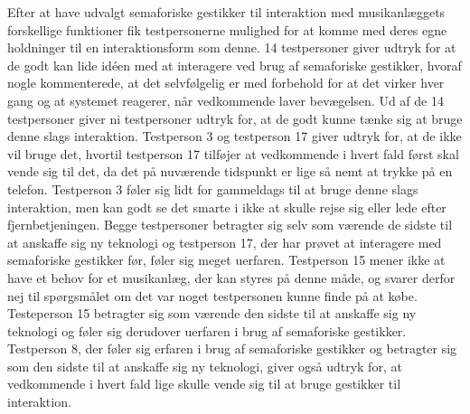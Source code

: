 Efter at have udvalgt semaforiske gestikker til interaktion med musikanlæggets forskellige funktioner fik testpersonerne mulighed for at komme med deres egne holdninger til en interaktionsform som denne. 14 testpersoner giver udtryk for at de godt kan lide idéen med at interagere ved brug af semaforiske gestikker, hvoraf nogle kommenterede, at det selvfølgelig er med forbehold for at det virker hver gang og at systemet reagerer, når vedkommende laver bevægelsen. Ud af de 14 testpersoner giver ni testpersoner udtryk for, at de godt kunne tænke sig at bruge denne slags interaktion. Testperson 3 og testperson 17 giver udtryk for, at de ikke vil bruge det, hvortil testperson 17 tilføjer at vedkommende i hvert fald først skal vende sig til det, da det på nuværende tidspunkt er lige så nemt at trykke på en telefon. Testperson 3 føler sig lidt for gammeldags til at bruge denne slags interaktion, men kan godt se det smarte i ikke at skulle rejse sig eller lede efter fjernbetjeningen. Begge testpersoner betragter sig selv som værende de sidste til at anskaffe sig ny teknologi og testperson 17, der har prøvet at interagere med semaforiske gestikker før, føler sig meget uerfaren. Testperson 15 mener ikke at have et behov for et musikanlæg, der kan styres på denne måde, og svarer derfor nej til spørgsmålet om det var noget testpersonen kunne finde på at købe. Testeperson 15 betragter sig som værende den sidste til at anskaffe sig ny teknologi og føler sig derudover uerfaren i brug af semaforiske gestikker. Testperson 8, der føler sig erfaren i brug af semaforiske gestikker og betragter sig som den sidste til at anskaffe sig ny teknologi, giver også udtryk for, at vedkommende i hvert fald lige skulle vende sig til at bruge gestikker til interaktion.

